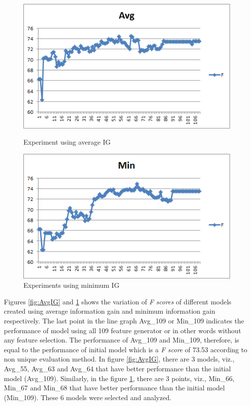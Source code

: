 \begin{figure}
\centering
\begin{minipage}{.5\textwidth}
  \centering
  \includegraphics[width=.95\textwidth]{figures/AvgIGAnalysis.png}
  \caption{Experiment using average IG}
  \label{fig:AvgIG}
\end{minipage}%
\begin{minipage}{.5\textwidth}
  \centering
  \includegraphics[width=.95\textwidth]{figures/MinIGAnalysis.png}
  \caption{Experiments using minimum IG}
  \label{fig:MinIG}
\end{minipage}
\end{figure} 

Figures \ref{fig:AvgIG} and \ref{fig:MinIG} shows the variation of \textit{F scores} of different models created using average information gain and minimum information gain respectively. The last point in the line graph Avg\_109 or Min\_109 indicates the performance of model using all 109 feature generator or in other words without any feature selection. The performance of Avg\_109 and Min\_109, therefore, is equal to the performance of initial model which is a \textit{F score} of 73.53 according to non unique evaluation method. In figure \ref{fig:AvgIG}, there are 3 models, viz., Avg\_55, Avg\_63 and Avg\_64 that have better performance than the initial model (Avg\_109). Similarly, in the figure \ref{fig:MinIG}, there are 3 points, viz., Min\_66, Min\_67 and Min\_68 that have better performance than the initial model (Min\_109). These 6 models were selected and analyzed.

